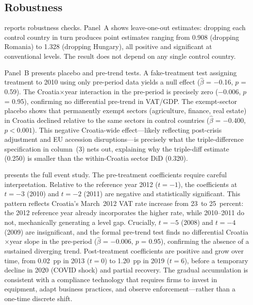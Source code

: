 \documentclass[12pt]{article}
\begin{document}
\subsection{Robustness}



 reports robustness checks. Panel~A shows leave-one-out estimates: dropping each control country in turn produces point estimates ranging from 0.908 (dropping Romania) to 1.328 (dropping Hungary), all positive and significant at conventional levels. The result does not depend on any single control country.

Panel~B presents placebo and pre-trend tests. A fake-treatment test assigning treatment to 2010 using only pre-period data yields a null effect ($\hat{\beta}$ = $-$0.16, $p$ = 0.59). The Croatia$\times$year interaction in the pre-period is precisely zero ($-$0.006, $p$ = 0.95), confirming no differential pre-trend in VAT/GDP. The exempt-sector placebo shows that permanently exempt sectors (agriculture, finance, real estate) in Croatia declined relative to the same sectors in control countries ($\hat{\beta}$ = $-$0.400, $p < 0.001$). This negative Croatia-wide effect---likely reflecting post-crisis adjustment and EU accession disruptions---is precisely what the triple-difference specification in  column~(3) nets out, explaining why the triple-diff estimate (0.250) is smaller than the within-Croatia sector DiD (0.320).



 presents the full event study. The pre-treatment coefficients require careful interpretation. Relative to the reference year 2012 ($t = -1$), the coefficients at $t = -3$ (2010) and $t = -2$ (2011) are negative and statistically significant. This pattern reflects Croatia's March~2012 VAT rate increase from 23~to 25~percent: the 2012 reference year already incorporates the higher rate, while 2010--2011 do not, mechanically generating a level gap. Crucially, $t = -5$ (2008) and $t = -4$ (2009) are insignificant, and the formal pre-trend test finds no differential Croatia$\times$year slope in the pre-period ($\hat{\beta}$ = $-$0.006, $p$ = 0.95), confirming the absence of a sustained diverging trend. Post-treatment coefficients are positive and grow over time, from 0.02~pp in 2013 ($t = 0$) to 1.20~pp in 2019 ($t = 6$), before a temporary decline in 2020 (COVID shock) and partial recovery. The gradual accumulation is consistent with a compliance technology that requires firms to invest in equipment, adapt business practices, and observe enforcement---rather than a one-time discrete shift.
\end{document}
